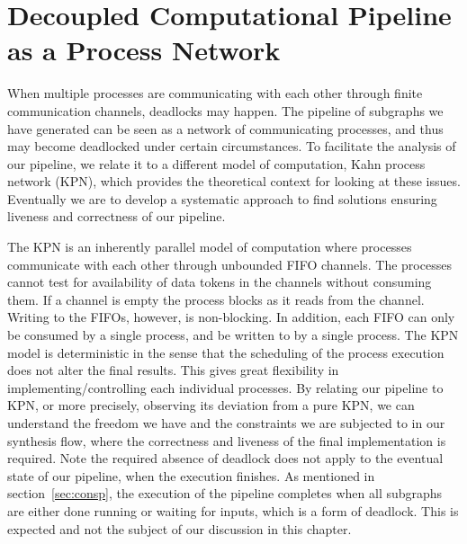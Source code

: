 
\chapter{Decoupled Computational Pipeline as a Process Network}
\label{liveprof}
When multiple processes are communicating with each other through finite communication channels, deadlocks may happen. The pipeline of subgraphs we have generated can be seen as a network
of communicating processes, and thus may become deadlocked under certain circumstances.
To facilitate the analysis of our pipeline, 
we relate it to a different model of computation, Kahn process network (KPN), which
provides the theoretical context for looking at these issues. Eventually we are to
develop a systematic approach to find solutions ensuring liveness and correctness of our pipeline.


The KPN is an inherently
parallel model of computation where processes communicate with
each other through unbounded FIFO channels. 
The processes cannot test for availability of data tokens in 
the channels without consuming them. If a channel is empty
the process blocks as it reads from the channel.
Writing to the FIFOs, however, is non-blocking.
In addition, each FIFO can only be consumed by a single process, and be written to by a single process. The KPN model is deterministic in the sense that the scheduling of
the process execution does not alter the final results. This gives great flexibility
in implementing/controlling each individual processes. 
By relating our pipeline to KPN, or more precisely, observing its deviation from a pure
KPN, we can understand the freedom we have and the constraints we are subjected
to in our synthesis flow, where the correctness and liveness of the final implementation is required. Note the required absence of deadlock does not
apply to the eventual state of our pipeline, when the execution finishes.
As mentioned in section~\ref{sec:consp}, the execution of the pipeline completes when all subgraphs are either done running or waiting for inputs, which is a form of deadlock. This is expected and not the subject of our discussion in this
chapter.




